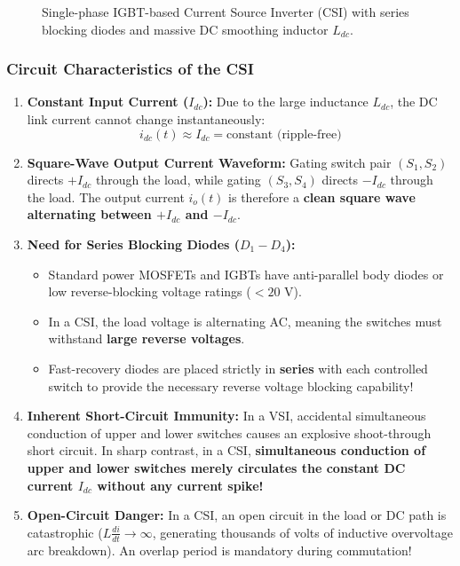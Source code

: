 \documentclass[11pt,a4paper]{article}
\begin{document}
\begin{figure}[htbp]
\caption{Single-phase IGBT-based Current Source Inverter (CSI) with series blocking diodes and massive DC smoothing inductor $L_{dc}$.}
\label{fig:csi_circuit}
\end{figure}

\subsubsection{Circuit Characteristics of the CSI}
\begin{enumerate}[leftmargin=*]
  \item \textbf{Constant Input Current ($I_{dc}$):} Due to the large inductance $L_{dc}$, the DC link current cannot change instantaneously:
  \begin{equation}
  i_{dc}(t) \approx I_{dc} = \text{constant (ripple-free)}
  \end{equation}
  \item \textbf{Square-Wave Output Current Waveform:} Gating switch pair $(S_1, S_2)$ directs $+I_{dc}$ through the load, while gating $(S_3, S_4)$ directs $-I_{dc}$ through the load. The output current $i_o(t)$ is therefore a \textbf{clean square wave alternating between $+I_{dc}$ and $-I_{dc}$}.
  \item \textbf{Need for Series Blocking Diodes ($D_1 - D_4$):}
  \begin{itemize}
    \item Standard power MOSFETs and IGBTs have anti-parallel body diodes or low reverse-blocking voltage ratings ($< 20\text{ V}$).
    \item In a CSI, the load voltage is alternating AC, meaning the switches must withstand \textbf{large reverse voltages}.
    \item Fast-recovery diodes are placed strictly in \textbf{series} with each controlled switch to provide the necessary reverse voltage blocking capability!
  \end{itemize}
  \item \textbf{Inherent Short-Circuit Immunity:} In a VSI, accidental simultaneous conduction of upper and lower switches causes an explosive shoot-through short circuit. In sharp contrast, in a CSI, \textbf{simultaneous conduction of upper and lower switches merely circulates the constant DC current $I_{dc}$ without any current spike!}
  \item \textbf{Open-Circuit Danger:} In a CSI, an open circuit in the load or DC path is catastrophic ($L \frac{di}{dt} \to \infty$, generating thousands of volts of inductive overvoltage arc breakdown). An overlap period is mandatory during commutation!
\end{enumerate}
\end{document}
